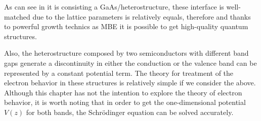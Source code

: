 As can see in  it is consisting a GaAs/\algaas heterostructure, these interface is well-matched due to the lattice parameters is relatively equals, therefore and thanks to powerful growth technics as MBE it is possible to get high-quality quantum structures. 

Also, the heterostructure composed by two semiconductors with different band gaps generate a discontinuity in either the conduction or the valence band can be represented by a constant potential term\cite{harrison2016quantum}.  The theory for treatment of the electron behavior in these structures is relatively simple if we consider the above. 
Although this chapter has not the intention to explore the theory of electron behavior, it is worth noting that in order to get the one-dimensional potential $V(z)$ for both bands,  the Schr\"odinger equation can be solved accurately. 



